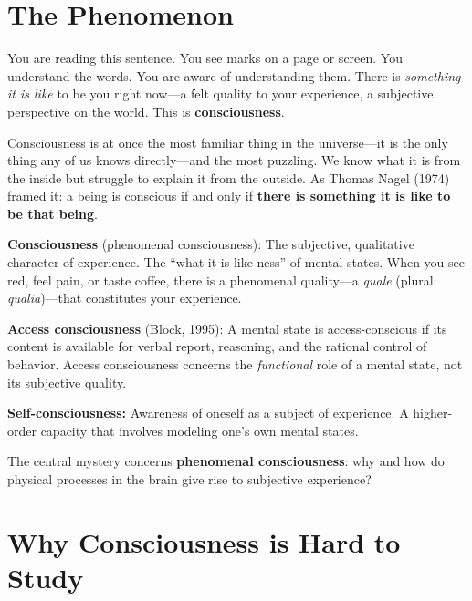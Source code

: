 \documentclass[11pt,a4paper]{report}
\begin{document}
\section{The Phenomenon}

You are reading this sentence. You see marks on a page or screen. You understand the words. You are aware of understanding them. There is \emph{something it is like} to be you right now---a felt quality to your experience, a subjective perspective on the world. This is \textbf{consciousness}.

Consciousness is at once the most familiar thing in the universe---it is the only thing any of us knows directly---and the most puzzling. We know what it is from the inside but struggle to explain it from the outside. As Thomas Nagel (1974) framed it: a being is conscious if and only if \textbf{there is something it is like to be that being}.

\begin{definitionbox}
\textbf{Consciousness} (phenomenal consciousness): The subjective, qualitative character of experience. The ``what it is like-ness'' of mental states. When you see red, feel pain, or taste coffee, there is a phenomenal quality---a \emph{quale} (plural: \emph{qualia})---that constitutes your experience.

\textbf{Access consciousness} (Block, 1995): A mental state is access-conscious if its content is available for verbal report, reasoning, and the rational control of behavior. Access consciousness concerns the \emph{functional} role of a mental state, not its subjective quality.

\textbf{Self-consciousness:} Awareness of oneself as a subject of experience. A higher-order capacity that involves modeling one's own mental states.

The central mystery concerns \textbf{phenomenal consciousness}: why and how do physical processes in the brain give rise to subjective experience?
\end{definitionbox}

\section{Why Consciousness is Hard to Study}
\end{document}
